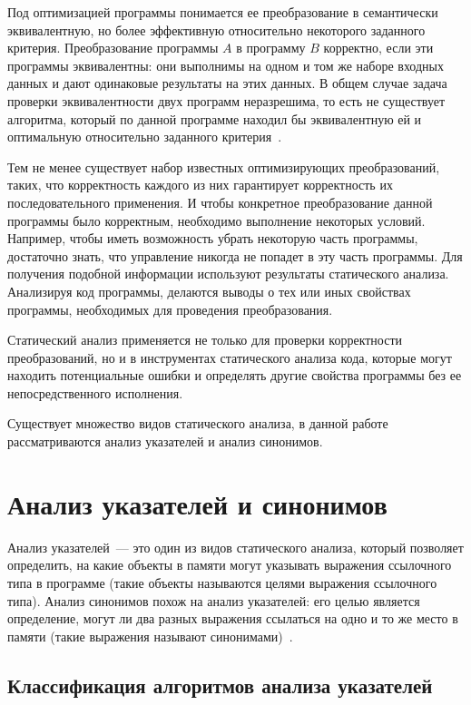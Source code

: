 \documentclass[14pt,titlepage]{extarticle}
\let\oldsection\section
\renewcommand{\section}{\newpage\oldsection}
\begin{document}
    Под оптимизацией программы понимается ее преобразование в
    семантически эквивалентную, но более эффективную относительно некоторого
    заданного критерия.
    Преобразование программы $A$ в программу $B$ корректно, если эти программы
    эквивалентны: они выполнимы на одном и том же наборе входных данных и дают
    одинаковые результаты на этих данных.
    В общем случае задача проверки эквивалентности двух программ неразрешима,
    то есть не существует алгоритма, который по данной программе находил бы
    эквивалентную ей и оптимальную относительно заданного
    критерия~\cite{kasjanov_translators}.

    Тем не менее существует набор известных оптимизирующих преобразований,
    таких, что корректность каждого из них гарантирует корректность их
    последовательного применения.
    И чтобы конкретное преобразование данной программы было корректным,
    необходимо выполнение некоторых условий. Например, чтобы иметь
    возможность убрать некоторую часть программы, достаточно знать, что
    управление никогда не попадет в эту часть программы.
    Для получения подобной информации используют результаты статического
    анализа. Анализируя код программы, делаются выводы о тех или иных свойствах
    программы, необходимых для проведения преобразования.

    Статический анализ применяется не только для проверки
    корректности преобразований, но и в инструментах статического анализа
    кода, которые могут находить потенциальные ошибки и определять
    другие свойства программы без ее непосредственного исполнения.

    Существует множество видов статического анализа, в данной работе
    рассматриваются анализ указателей и анализ синонимов.

  \section{Анализ указателей и синонимов}

    Анализ указателей~--- это один из видов статического анализа, который
    позволяет определить, на какие объекты в памяти могут указывать выражения
    ссылочного типа в программе (такие объекты называются целями выражения
    ссылочного типа). Анализ синонимов похож на анализ указателей: его целью
    является определение, могут ли два разных выражения ссылаться на одно и
    то же место в памяти (такие выражения называют синонимами)~\cite{andersen}.

    \subsection{Классификация алгоритмов анализа указателей}
    \label{section:analysis_classification}
\end{document}
